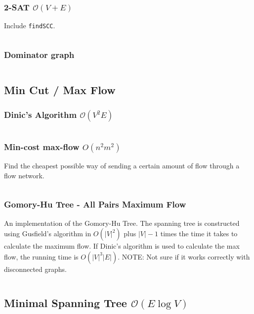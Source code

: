\documentclass[9pt,a4paper,landscape,oneside]{amsart}
\newcommand{\mintedstyle}[2]{\inputminted{#1}{code/#2}}
\newcommand{\code}[1]{\mintedstyle{cpp}{#1}}
\begin{document}
\begin{multicols*}{3}
\subsubsection{2-SAT $\mathcal{O}(V+E)$}
Include \texttt{findSCC}.
\code{satsolver.cpp}

\subsubsection{Dominator graph}
\code{graphs/dominator.cpp}

\subsection{Min Cut / Max Flow}
\subsubsection{Dinic's Algorithm $\mathcal{O}(V^{2} E)$}
\code{graphs/dinic.cpp}

\subsubsection{Min-cost max-flow $O(n^2 m^2)$}
Find the cheapest possible way of sending a certain amount of flow through a flow network.
\code{graphs/mincostmaxflow.cpp}

\subsubsection{Gomory-Hu Tree - All Pairs Maximum Flow}
An implementation of the Gomory-Hu Tree. The spanning tree is constructed using Gusfield's algorithm
in $O(|V| ^ 2)$ plus $|V|-1$ times the time it takes to calculate the maximum flow.
If Dinic's algorithm is used to calculate the max flow, the running time is $O(|V|^3|E|)$.
NOTE: Not sure if it works correctly with disconnected graphs.
\code{graphs/gomory_hu_tree.cpp}

\subsection{Minimal Spanning Tree $\mathcal{O}(E \log V)$}


\end{multicols*}
\end{document}
